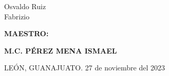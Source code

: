 \begin{titlepage}
\begin{minipage}{180mm}
{{{				Osvaldo Ruiz\\
				Fabrizio
			}}\par
		}
		\vspace{10mm}
		{\fontsize{14}{18pt}\selectfont{}
			\textbf{
				MAESTRO:
			}\par
		}
		\vspace{5mm}
		{\fontsize{12}{16pt}\selectfont{}
			\textbf{
				M.C. PÉREZ MENA ISMAEL
			}\par
		}
		\vspace{12mm}
		{\fontsize{10}{14pt}\selectfont{}
			LEÓN, GUANAJUATO. \hspace{70mm} 27 de noviembre del 2023\par
		}
	\end{minipage}
\end{titlepage}
\restoregeometry